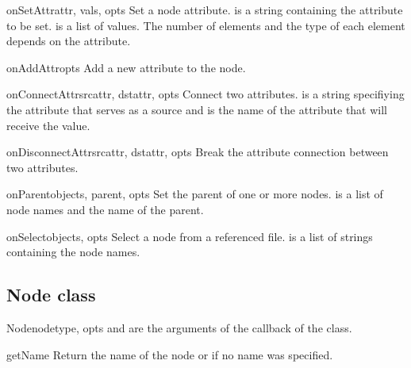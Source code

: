 \begin{methoddesc}{onSetAttr}{attr, vals, opts}
Set a node attribute.  is a string containing the attribute
to be set.  is a list of values. The number of elements and
the type of each element depends on the attribute.
\end{methoddesc}

\begin{methoddesc}{onAddAttr}{opts}
Add a new attribute to the node.
\end{methoddesc}

\begin{methoddesc}{onConnectAttr}{srcattr, dstattr, opts}
Connect two attributes.  is a string specifiying the
attribute that serves as a source and  is the name of
the attribute that will receive the value. 
\end{methoddesc}

\begin{methoddesc}{onDisconnectAttr}{srcattr, dstattr, opts}
Break the attribute connection between two attributes.
\end{methoddesc}

\begin{methoddesc}{onParent}{objects, parent, opts}
Set the parent of one or more nodes.  is a list of node names
and  the name of the parent.
\end{methoddesc}

\begin{methoddesc}{onSelect}{objects, opts}
Select a node from a referenced file.  is a list of strings
containing the node names.
\end{methoddesc}

\subsection{Node class}

\begin{classdesc}{Node}{nodetype, opts}
   and  are the arguments of the 
   callback of the  class.
\end{classdesc}

\begin{methoddesc}{getName}{}
Return the name of the node or  if no name was specified.
\end{methoddesc}

